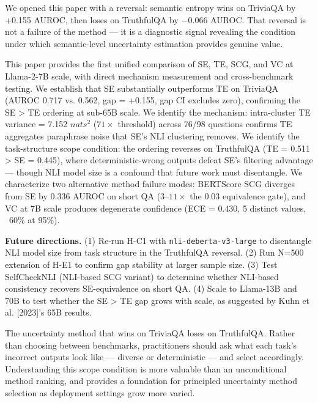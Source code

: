 
We opened this paper with a reversal: semantic entropy wins on TriviaQA by +0.155 AUROC, then loses on TruthfulQA by $-0.066$ AUROC. That reversal is not a failure of the method --- it is a diagnostic signal revealing the condition under which semantic-level uncertainty estimation provides genuine value.

This paper provides the first unified comparison of SE, TE, SCG, and VC at Llama-2-7B scale, with direct mechanism measurement and cross-benchmark testing. We establish that SE substantially outperforms TE on TriviaQA (AUROC 0.717 vs. 0.562, gap = +0.155, gap CI excludes zero), confirming the SE > TE ordering at sub-65B scale. We identify the mechanism: intra-cluster TE variance = 7.152 $nats^2$ ($71\times$ threshold) across 76/98 questions confirms TE aggregates paraphrase noise that SE's NLI clustering removes. We identify the task-structure scope condition: the ordering reverses on TruthfulQA (TE = 0.511 > SE = 0.445), where deterministic-wrong outputs defeat SE's filtering advantage --- though NLI model size is a confound that future work must disentangle. We characterize two alternative method failure modes: BERTScore SCG diverges from SE by 0.336 AUROC on short QA (3--$11\times$ the 0.03 equivalence gate), and VC at 7B scale produces degenerate confidence (ECE = 0.430, 5 distinct values, ~60\% at 95\%).

\textbf{Future directions.} (1) Re-run H-C1 with \texttt{nli-deberta-v3-large} to disentangle NLI model size from task structure in the TruthfulQA reversal. (2) Run N=500 extension of H-E1 to confirm gap stability at larger sample size. (3) Test SelfCheckNLI (NLI-based SCG variant) to determine whether NLI-based consistency recovers SE-equivalence on short QA. (4) Scale to Llama-13B and 70B to test whether the SE > TE gap grows with scale, as suggested by Kuhn et al. [2023]'s 65B results.

The uncertainty method that wins on TriviaQA loses on TruthfulQA. Rather than choosing between benchmarks, practitioners should ask what each task's incorrect outputs look like --- diverse or deterministic --- and select accordingly. Understanding this scope condition is more valuable than an unconditional method ranking, and provides a foundation for principled uncertainty method selection as deployment settings grow more varied.

